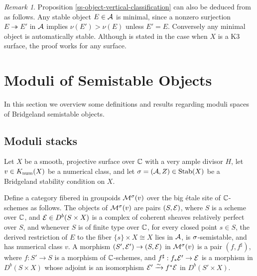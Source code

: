 \documentclass[letterpaper,11pt]{amsart}%
\theoremstyle{remark}
\newtheorem{rmk}[thm]{Remark}
\begin{document}
\begin{rmk}
Proposition \ref{ss-object-vertical-classification} can also be deduced from \cite[Proposition 2.2]{huy} as follows. Any stable object $E \in \mathcal{A}$ is minimal, since a nonzero surjection $E \twoheadrightarrow E'$ in $\mathcal{A}$ implies $\nu(E') > \nu(E)$ unless $E' = E$. Conversely any minimal object is automatically stable. Although \cite[Proposition 2.2]{huy} is stated in the case when $X$ is a K3 surface, the proof works for any surface.
\end{rmk}





\section{Moduli of Semistable Objects}
In this section we overview some definitions and results regarding moduli spaces of Bridgeland semistable objects. 

\subsection{Moduli stacks}
Let $X$ be a smooth, projective surface over $\mathbb{C}$ with a very ample divisor $H$, let $v \in K_{\mathrm{num}}(X)$ be a numerical class, and let $\sigma = (\mathcal{A}, Z) \in \operatorname{\mathrm{Stab}}(X)$ be a Bridgeland stability condition on $X$.

Define a category fibered in groupoids $\mathcal{M}^\sigma(v)$ over the big \'etale site of $\mathbb{C}$-schemes as follows. The objects of $\mathcal{M}^\sigma(v)$ are pairs $(S, \mathcal{E})$, where $S$ is a scheme over $\mathbb{C}$, and $\mathcal{E} \in D^b(S \times X)$ is a complex of coherent sheaves relatively perfect over $S$, and whenever $S$ is of finite type over $\mathbb{C}$, for every closed point $s \in S$, the derived restriction of $E$ to the fiber $\{s\} \times X \cong X$ lies in $\mathcal{A}$, is $\sigma$-semistable, and has numerical class $v$. A morphism $(S', \mathcal{E}') \to (S, \mathcal{E})$ in $\mathcal{M}^\sigma(v)$ is a pair $(f, f^\sharp)$, where $f: S' \to S$ is a morphism of $\mathbb{C}$-schemes, and $f^\sharp: f_* \mathcal{E}' \to \mathcal{E}$ is a morphism in $D^b(S \times X)$ whose adjoint is an isomorphism $\mathcal{E}' \xrightarrow{\sim} f^* \mathcal{E}$ in $D^b(S' \times X)$.
\end{document}
